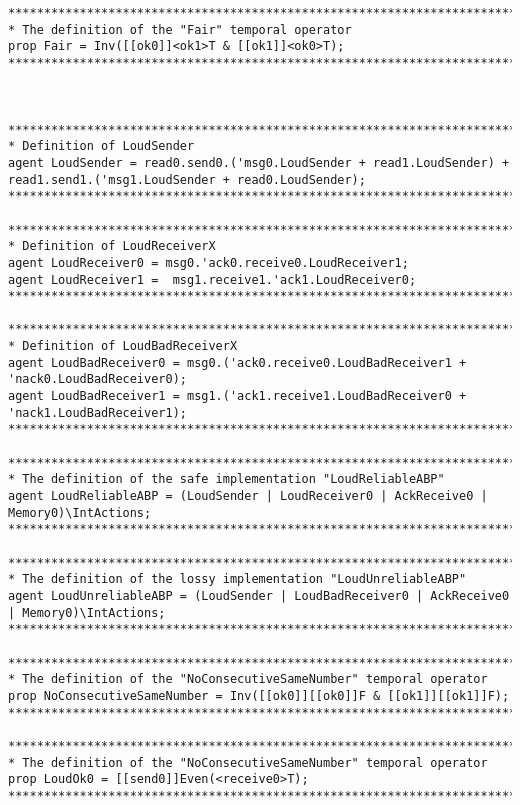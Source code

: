 \begin{verbatim}
*******************************************************************************
* The definition of the "Fair" temporal operator
prop Fair = Inv([[ok0]]<ok1>T & [[ok1]]<ok0>T);
*******************************************************************************



*******************************************************************************
* Definition of LoudSender
agent LoudSender = read0.send0.('msg0.LoudSender + read1.LoudSender) + read1.send1.('msg1.LoudSender + read0.LoudSender);
*******************************************************************************

*******************************************************************************
* Definition of LoudReceiverX
agent LoudReceiver0 = msg0.'ack0.receive0.LoudReceiver1;
agent LoudReceiver1 =  msg1.receive1.'ack1.LoudReceiver0;
*******************************************************************************

*******************************************************************************
* Definition of LoudBadReceiverX
agent LoudBadReceiver0 = msg0.('ack0.receive0.LoudBadReceiver1 + 'nack0.LoudBadReceiver0);
agent LoudBadReceiver1 = msg1.('ack1.receive1.LoudBadReceiver0 + 'nack1.LoudBadReceiver1);
*******************************************************************************

*******************************************************************************
* The definition of the safe implementation "LoudReliableABP"
agent LoudReliableABP = (LoudSender | LoudReceiver0 | AckReceive0 | Memory0)\IntActions;
*******************************************************************************

*******************************************************************************
* The definition of the lossy implementation "LoudUnreliableABP"
agent LoudUnreliableABP = (LoudSender | LoudBadReceiver0 | AckReceive0 | Memory0)\IntActions;
*******************************************************************************

*******************************************************************************
* The definition of the "NoConsecutiveSameNumber" temporal operator
prop NoConsecutiveSameNumber = Inv([[ok0]][[ok0]]F & [[ok1]][[ok1]]F);
*******************************************************************************

*******************************************************************************
* The definition of the "NoConsecutiveSameNumber" temporal operator
prop LoudOk0 = [[send0]]Even(<receive0>T);
*******************************************************************************


\end{verbatim}
